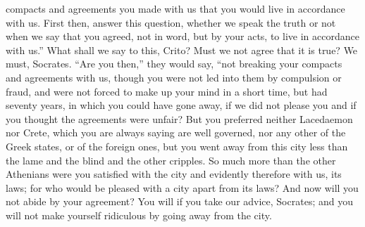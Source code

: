\documentclass[letterpaper,12pt]{article}
\begin{document}
\begin{drama}
compacts and agreements you made with us that you would live in accordance with us. First then, answer this question, whether we speak the truth or not when we say that you agreed, not in word, but by your acts, to live in accordance with us.'' What shall we say to this, Crito? Must we not agree that it is true?
\critospeaks 
We must, Socrates.
\socratesspeaks 
``Are you then,'' they would say, ``not breaking  your compacts and agreements with us, though you were not led into them by compulsion or fraud, and were not forced to make up your mind in a short time, but had seventy years, in which you could have gone away, if we did not please you and if you thought the agreements were unfair? But you preferred neither Lacedaemon nor Crete, which you are always saying are well governed, nor any other of the Greek states,  or of the foreign ones, but you went away from this city less than the lame and the blind and the other cripples. So much more than the other Athenians were you satisfied with the city and evidently therefore with us, its laws; for who would be pleased with a city apart from its laws? And now will you not abide by your agreement? You will if you take our advice, Socrates; and you will not make yourself ridiculous by going away from the city.
\par
\vspace{0.3em}

\end{drama}
\end{document}
